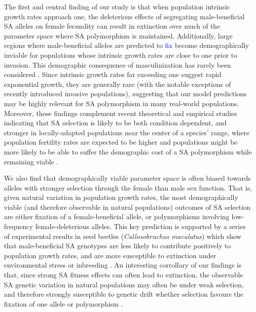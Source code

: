 \documentclass[11pt]{article}
\begin{document}
The first and central finding of our study is that when population intrinsic growth rates approach one, the deleterious effects of segregating male-beneficial SA alleles on female fecundity can result in extinction over much of the parameter space where SA polymorphism is maintained. Additionally, large regions where male-beneficial alleles are predicted to \textcolor{blue}{fix} become demographically inviable for populations whose intrinsic growth rates are close to one prior to invasion. This demographic consequence of masculinization has rarely been considered \citep{hitchcock2020gene}. Since intrinsic growth rates far exceeding one suggest rapid exponential growth, they are generally rare (with the notable exceptions of recently introduced invasive populations), suggesting that our model predictions may be highly relevant for SA polymorphism in many real-world populations. Moreover, these findings complement recent theoretical and empirical studies indicating that SA selection is likely to be both condition dependent, and stronger in locally-adapted populations near the center of a species' range, where population fertility rates are expected to be higher and populations might be more likely to be able to suffer the demographic cost of a SA polymorphism while remaining viable \citep{BergerEtAl2014, Connallon2015}. 

We also find that demographically viable parameter space is often biased towards alleles with stronger selection through the female than male sex function. That is, given natural variation in population growth rates, the most demographically viable (and therefore observable in natural populations) outcomes of SA selection are either fixation of a female-beneficial allele, or polymorphisms involving low-frequency female-deleterious alleles. This key prediction is supported by a series of experimental results in seed beetles ({\itshape Callosobruchus maculatus}) which show that male-beneficial SA genotypes are less likely to contribute positively to population growth rates, and are more susceptible to extinction under environmental stress or inbreeding \citep{BergerEtAl2014, berger2016intralocus, grieshop2017male}. An interesting corrollary of our findings is that, since strong SA fitness effects can often lead to extinction, the observable SA genetic variation in natural populations may often be under weak selection, and therefore strongly susceptible to genetic drift whether selection favours the fixation of one allele or polymorphism \citep{ConnallonClark2012}. 
\end{document}
